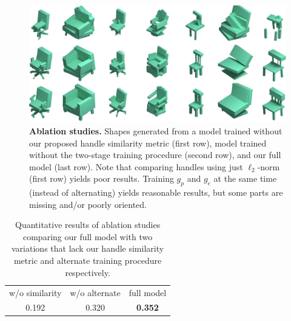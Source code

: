 \begin{figure}[t]
\centering
\includegraphics[width=1.0\linewidth]{handles/imgs/ablation.png}
\vspace{-15pt}
\caption{\label{fig:abl} \small
\textbf{Ablation studies.}
Shapes generated from a model trained without our proposed handle similarity metric (first row),
model trained without the two-stage training procedure (second row), and our full model (last row).
Note that comparing handles using just $\ell_2$-norm (first row) yields poor results.
Training $g_p$ and $g_e$ at the same time (instead of alternating) yields reasonable results, but some parts
are missing and/or poorly oriented.
}
\end{figure}
\begin{table}[]
\centering
\begin{tabular}{ccc}
\hline
w/o similarity & w/o alternate & full model \\
0.192 & 0.320 & \textbf{0.352}\\
\hline
\end{tabular}
\caption{ \small
\label{tab:abl}
Quantitative results of ablation studies comparing our full model with two variations that lack our handle similarity metric and alternate training procedure respectively.
}
\vspace{-0.1in}
\end{table}

